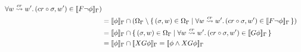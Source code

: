 \begin{align}
{         \forall {w \overset{cr}{\rightsquigarrow} w'} \ldotp {(cr \circ \sigma, w') \in \llbracket F\neg\phi \rrbracket_{\Gamma}}}) \notag \\
    &= \llbracket \phi \rrbracket_{\Gamma} \cap (\Omega_{\Gamma} \setminus \set{(\sigma, w) \in \Omega_{\Gamma} |
         \forall {w \overset{cr}{\rightsquigarrow} w'} \ldotp {(cr \circ \sigma, w') \in \llbracket F\neg\phi \rrbracket_{\Gamma}}}) \notag \\
    &= \llbracket \phi \rrbracket_{\Gamma} \cap \set{(\sigma, w) \in \Omega_{\Gamma} | \forall {w \overset{cr}{\rightsquigarrow} w'} \ldotp {(cr \circ
         \sigma, w') \in \llbracket G\phi \rrbracket_{\Gamma}}} \notag \\
    &= \llbracket \phi \rrbracket_{\Gamma} \cap \llbracket XG\phi \rrbracket_{\Gamma}
     = \llbracket \phi \land XG\phi \rrbracket_{\Gamma} \label{eq:foreversem}
\end{align}

